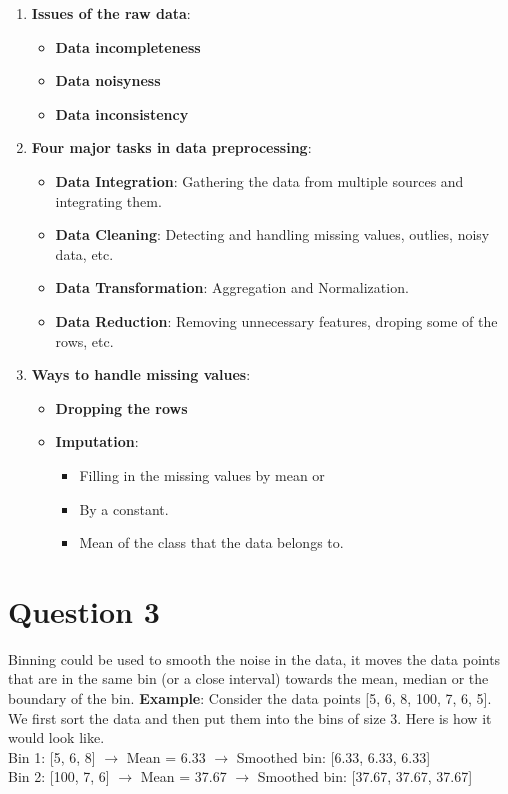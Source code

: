 \documentclass[a4paper,12pt]{article}
\begin{document}
\begin{enumerate}
    \item \textbf{Issues of the raw data}:
    \begin{itemize}
        \item \textbf{Data incompleteness}
        \item \textbf{Data noisyness}
        \item \textbf{Data inconsistency}
    \end{itemize}
    \item \textbf{Four major tasks in data preprocessing}:
    \begin{itemize}
        \item \textbf{Data Integration}: Gathering the data from multiple sources and integrating them.
        \item \textbf{Data Cleaning}: Detecting and handling missing values, outlies, noisy data, etc.
        \item \textbf{Data Transformation}: Aggregation and Normalization.
        \item \textbf{Data Reduction}: Removing unnecessary features, droping some of the rows, etc.
    \end{itemize}
    \item \textbf{Ways to handle missing values}:
    \begin{itemize}
        \item \textbf{Dropping the rows}
        \item \textbf{Imputation}:
        \begin{itemize}
            \item Filling in the missing values by mean or
            \item By a constant.
            \item Mean of the class that the data belongs to.
        \end{itemize}
    \end{itemize}
\end{enumerate}

\section*{Question 3}
Binning could be used to smooth the noise in the data, it moves the data points that are in the same bin (or a close interval) towards the mean, median or the boundary of the bin. 
\textbf{Example}: Consider the data points [5, 6, 8, 100, 7, 6, 5]. We first sort the data and then put them into the bins of size 3. Here is how it would look like. \\ 
Bin 1: [5, 6, 8] $\rightarrow$ Mean = 6.33 $\rightarrow$ Smoothed bin: [6.33, 6.33, 6.33] \\ 
Bin 2: [100, 7, 6] $\rightarrow$ Mean = 37.67 $\rightarrow$ Smoothed bin: [37.67, 37.67, 37.67]  
\end{document}
